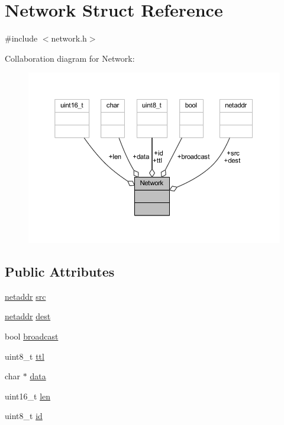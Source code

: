 \hypertarget{struct_network}{}\section{Network Struct Reference}
\label{struct_network}


{\ttfamily \#include $<$network.\+h$>$}



Collaboration diagram for Network\+:\nopagebreak
\begin{figure}[H]
\begin{center}
\leavevmode
\includegraphics[width=350pt]{struct_network__coll__graph}
\end{center}
\end{figure}
\subsection*{Public Attributes}
\begin{DoxyCompactItemize}
\item 
\hyperlink{network_8h_a1924fa1e3480e5fb3c72b8ef3e243f57}{netaddr} \hyperlink{struct_network_aea4b9cff07746e6716d666b8f30206c3}{src}
\item 
\hyperlink{network_8h_a1924fa1e3480e5fb3c72b8ef3e243f57}{netaddr} \hyperlink{struct_network_afdd665550f4249de0fe44a6873c106d5}{dest}
\item 
bool \hyperlink{struct_network_a32536a76f2f24b4698231a165fdd26a8}{broadcast}
\item 
uint8\+\_\+t \hyperlink{struct_network_ae8a4e88963892ccee2ef2c239bb3db96}{ttl}
\item 
char $\ast$ \hyperlink{struct_network_af7fa8b4f2478521145ff17044e9915ad}{data}
\item 
uint16\+\_\+t \hyperlink{struct_network_ab0daba9b245e77e45d2bffa050271285}{len}
\item 
uint8\+\_\+t \hyperlink{struct_network_ad71808f984c9440168801c285d9e0904}{id}
\end{DoxyCompactItemize}


